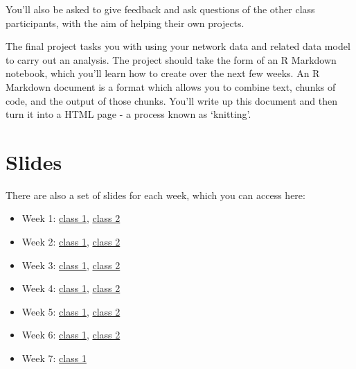\documentclass[
]{book}
\begin{document}
You'll also be asked to give feedback and ask questions of the other
class participants, with the aim of helping their own projects.

The final project tasks you with using your network data and related
data model to carry out an analysis. The project should take the form of
an R Markdown notebook, which you'll learn how to create over the next
few weeks. An R Markdown document is a format which allows you to
combine text, chunks of code, and the output of those chunks. You'll
write up this document and then turn it into a HTML page - a process
known as `knitting'.

\hypertarget{slides}{%
\section{Slides}\label{slides}}

There are also a set of slides for each week, which you can access here:

\begin{itemize}
\item
  Week 1: \href{https://comhis.github.io/applying-network-analysis-to-humanities/slides/1-1-introduction.html}{class
  1},
  \href{https://comhis.github.io/applying-network-analysis-to-humanities/slides/1-2-intro-to-r.html}{class
  2}
\item
  Week 2: \href{https://comhis.github.io/applying-network-analysis-to-humanities/slides/2-1-network-data.html}{class
  1},
  \href{https://comhis.github.io/applying-network-analysis-to-humanities/slides/2-2-data-cleaning.html}{class
  2}
\item
  Week 3: \href{https://comhis.github.io/applying-network-analysis-to-humanities/slides/3-1-fundamentals-data-modelling.html}{class
  1},
  \href{https://comhis.github.io/applying-network-analysis-to-humanities/slides/3-2-building-data-model.html}{class
  2}
\item
  Week 4: \href{https://comhis.github.io/applying-network-analysis-to-humanities/slides/4-1-fundamentals.html}{class
  1},
  \href{https://comhis.github.io/applying-network-analysis-to-humanities/slides/4-2-networks-with-r.html}{class
  2}
\item
  Week 5: \href{https://comhis.github.io/applying-network-analysis-to-humanities/slides/5-1-visualising-with-ggraph.html}{class
  1},
  \href{https://comhis.github.io/applying-network-analysis-to-humanities/slides/visualising-gephi.html}{class
  2}
\item
  Week 6: \href{https://comhis.github.io/applying-network-analysis-to-humanities/slides/bipartite-networks.html}{class
  1},
  \href{https://comhis.github.io/applying-network-analysis-to-humanities/slides/6-2-literary-linguistic.html}{class
  2}
\item
  Week 7: \href{https://comhis.github.io/applying-network-analysis-to-humanities/slides/7-reflections.html}{class
  1}
\end{itemize}
\end{document}
